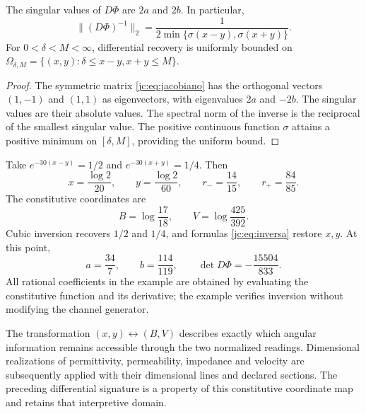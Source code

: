 \begin{proposition}
The singular values of $D\Phi$ are $2a$ and $2b$. In particular,
\[
\bigl\|(D\Phi)^{-1}\bigr\|_2
=\frac1{2\min\{\sigma(x-y),\sigma(x+y)\}}.
\]
For $0<\delta<M<\infty$, differential recovery is uniformly bounded on $\Omega_{\delta,M}=\{(x,y):\delta\le x-y,x+y\le M\}$.
\end{proposition}
\begin{proof}
The symmetric matrix \eqref{jc:eq:jacobiano} has the orthogonal vectors $(1,-1)$ and $(1,1)$ as eigenvectors, with eigenvalues $2a$ and $-2b$. The singular values are their absolute values. The spectral norm of the inverse is the reciprocal of the smallest singular value. The positive continuous function $\sigma$ attains a positive minimum on $[\delta,M]$, providing the uniform bound.
\end{proof}

\begin{example}
Take $e^{-30(x-y)}=1/2$ and $e^{-30(x+y)}=1/4$. Then
\[
x=\frac{\log2}{20},\qquad y=\frac{\log2}{60},\qquad
r_-=\frac{14}{15},\qquad r_+=\frac{84}{85}.
\]
The constitutive coordinates are
\[
B=\log\frac{17}{18},\qquad V=\log\frac{425}{392}.
\]
Cubic inversion recovers $1/2$ and $1/4$, and formulas \eqref{jc:eq:inversa} restore $x,y$. At this point,
\[
a=\frac{34}{7},\qquad b=\frac{114}{119},\qquad
\det D\Phi=-\frac{15504}{833}.
\]
All rational coefficients in the example are obtained by evaluating the constitutive function and its derivative; the example verifies inversion without modifying the channel generator.
\end{example}

The transformation $(x,y)\leftrightarrow(B,V)$ describes exactly which angular information remains accessible through the two normalized readings. Dimensional realizations of permittivity, permeability, impedance and velocity are subsequently applied with their dimensional lines and declared sections. The preceding differential signature is a property of this constitutive coordinate map and retains that interpretive domain.
